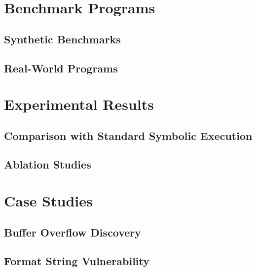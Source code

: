 \section{Benchmark Programs}
\subsection{Synthetic Benchmarks}

\subsection{Real-World Programs}

\section{Experimental Results}
\subsection{Comparison with Standard Symbolic Execution}

\subsection{Ablation Studies}

\section{Case Studies}
\subsection{Buffer Overflow Discovery}

\subsection{Format String Vulnerability}
